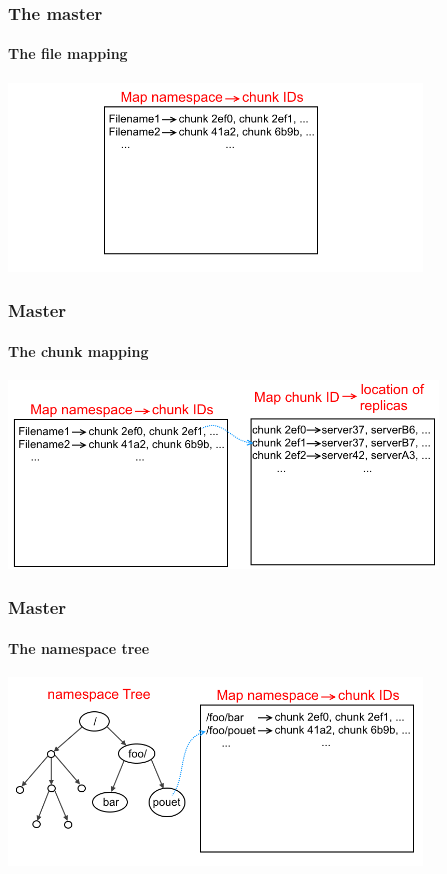 \documentclass{beamer}
\begin{document}
\newcommand{\masterpicheight}{5cm}
%
\begin{frame}
 \frametitle{The master}
 \framesubtitle{The file mapping}
 \centering
 \includegraphics[height=\masterpicheight]{figures/namespaceMapschema.png}
\end{frame}
\begin{frame}
 \frametitle{Master}
 \framesubtitle{The chunk mapping}
 \centering
 \includegraphics[height=\masterpicheight]{figures/namespaceMapMapschema.png}
\end{frame}
\begin{frame}
 \frametitle{Master}
 \framesubtitle{The namespace tree}
 \centering
 \includegraphics[height=\masterpicheight]{figures/namespaceTreeMapschema.png}
\end{frame}
\end{document}
